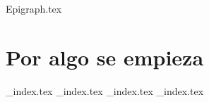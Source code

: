 {Epigraph.tex}
\part{Por algo se empieza}
  {_index.tex}
  {_index.tex}
  {_index.tex}
  {_index.tex}
